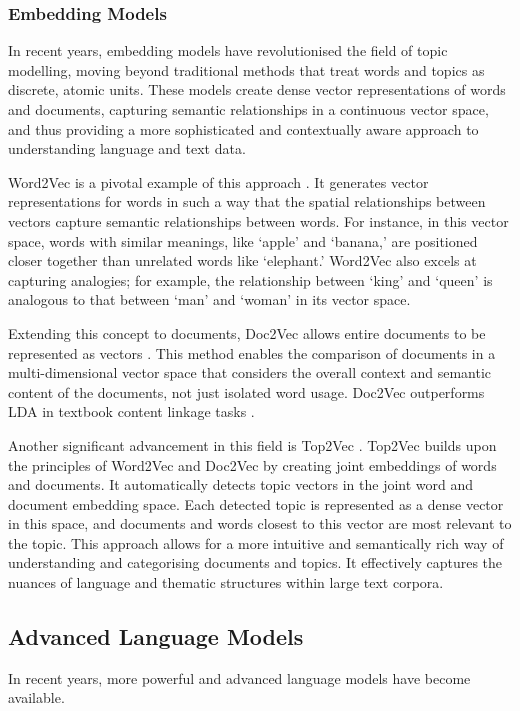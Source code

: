 \documentclass[twocolumn]{article}
\begin{document}
\subsubsection{Embedding Models}

In recent years, embedding models have revolutionised the field of topic modelling, moving beyond traditional methods that treat words and topics as discrete, atomic units. These models create dense vector representations of words and documents, capturing semantic relationships in a continuous vector space, and thus providing a more sophisticated and contextually aware approach to understanding language and text data.

Word2Vec is a pivotal example of this approach \cite{mikolov2013}. It generates vector representations for words in such a way that the spatial relationships between vectors capture semantic relationships between words. For instance, in this vector space, words with similar meanings, like `apple' and `banana,' are positioned closer together than unrelated words like `elephant.' Word2Vec also excels at capturing analogies; for example, the relationship between `king' and `queen' is analogous to that between `man' and `woman' in its vector space.

Extending this concept to documents, Doc2Vec allows entire documents to be represented as vectors \cite{le2014}. This method enables the comparison of documents in a multi-dimensional vector space that considers the overall context and semantic content of the documents, not just isolated word usage. Doc2Vec outperforms LDA in textbook content linkage tasks \cite{thaker2018}.

Another significant advancement in this field is Top2Vec \cite{angelov2020}. Top2Vec builds upon the principles of Word2Vec and Doc2Vec by creating joint embeddings of words and documents. It automatically detects topic vectors in the joint word and document embedding space. Each detected topic is represented as a dense vector in this space, and documents and words closest to this vector are most relevant to the topic. This approach allows for a more intuitive and semantically rich way of understanding and categorising documents and topics. It effectively captures the nuances of language and thematic structures within large text corpora.


\subsection{Advanced Language Models}
In recent years, more powerful and advanced language models have become available.
\end{document}
